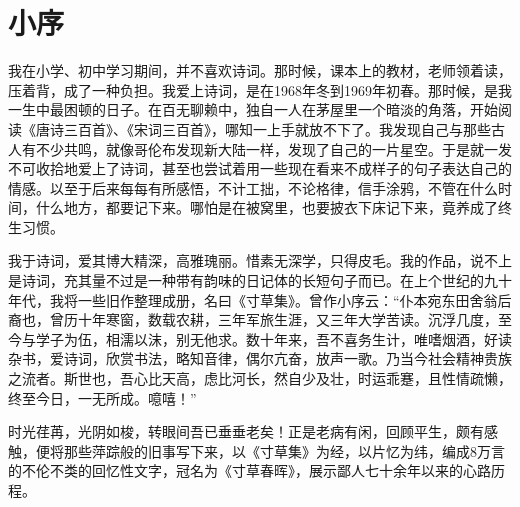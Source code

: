 \documentclass[../../dazhuan.tex]{subfiles}
\begin{document}
    \chapter*{小序}

我在小学、初中学习期间，并不喜欢诗词。那时候，课本上的教材，老师领着读，压着背，成了一种负担。我爱上诗词，是在1968年冬到1969年初春。那时候，是我一生中最困顿的日子。在百无聊赖中，独自一人在茅屋里一个暗淡的角落，开始阅读《唐诗三百首》、《宋词三百首》，哪知一上手就放不下了。我发现自己与那些古人有不少共鸣，就像哥伦布发现新大陆一样，发现了自己的一片星空。于是就一发不可收拾地爱上了诗词，甚至也尝试着用一些现在看来不成样子的句子表达自己的情感。以至于后来每每有所感悟，不计工拙，不论格律，信手涂鸦，不管在什么时间，什么地方，都要记下来。哪怕是在被窝里，也要披衣下床记下来，竟养成了终生习惯。

我于诗词，爱其博大精深，高雅瑰丽。惜素无深学，只得皮毛。我的作品，说不上是诗词，充其量不过是一种带有韵味的日记体的长短句子而已。在上个世纪的九十年代，我将一些旧作整理成册，名曰《寸草集》。曾作小序云：“仆本宛东田舍翁后裔也，曾历十年寒窗，数载农耕，三年军旅生涯，又三年大学苦读。沉浮几度，至今与学子为伍，相濡以沫，别无他求。数十年来，吾不喜务生计，唯嗜烟酒，好读杂书，爱诗词，欣赏书法，略知音律，偶尔亢奋，放声一歌。乃当今社会精神贵族之流者。斯世也，吾心比天高，虑比河长，然自少及壮，时运乖蹇，且性情疏懒，终至今日，一无所成。噫嘻！”
    
时光荏苒，光阴如梭，转眼间吾已垂垂老矣！正是老病有闲，回顾平生，颇有感触，便将那些萍踪般的旧事写下来，以《寸草集》为经，以片忆为纬，编成8万言的不伦不类的回忆性文字，冠名为《寸草春晖》，展示鄙人七十余年以来的心路历程。
   
\end{document}
